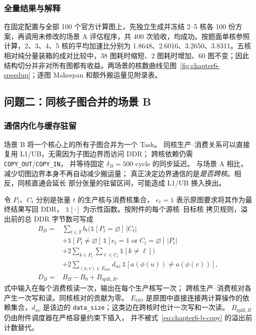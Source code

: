 \subsubsection{全量结果与解释}
在固定配置与全部 100 个官方计算图上，先独立生成并冻结 2--5 核各 100 份方案，再调用未修改的场景 A 评估程序，共 400 次验收，均成功。按题面单核参照计算，2、3、4、5 核的平均加速比分别为 1.8648、2.6016、3.2650、3.8311。五核相对纯分量装箱的成对比较中，38 图耗时缩短、2 图耗时增加、60 图不变；因此结构切分并非对所有图都有收益。两场景的核数曲线见图~\ref{fig:chapter6-speedup}；逐图 Makespan 和额外搬运量见附录表。

\subsection{问题二：同核子图合并的场景 B}
\subsubsection{通信内化与缓存驻留}
场景 B 将一个核心上的所有子图合并为一个 Task。
同核生产--消费关系可以直接复用 L1/UB，无需因为子图边界而访问 DDR；
跨核依赖仍需 \texttt{COPY\_OUT}/\texttt{COPY\_IN}，
并等待固定 $\delta_B=500$ cycle 的同步延迟。
与场景 A 相比，减少切图边界本身不再自动减少搬运量；
真正决定边界通信的是\emph{是否跨核}。相反，同核直通会延长
部分张量的驻留区间，可能造成 L1/UB 换入换出。

令 $P_t$、$C_t$ 分别是张量 $t$ 的生产核与消费核集合，
$e_t=1$ 表示原图要求将其作为最终结果写回 DDR，
$\mathbb 1[\cdot]$ 为示性函数。按附件的每个源核--目标核
拷贝规则，溢出前的总 DDR 字节数可写成
\begin{equation}
\begin{aligned}
B_B={}&\sum_{t\in T}b_t\Bigg(
\mathbb 1[P_t=\varnothing]\,|C_t|\\
&+\mathbb 1[P_t\ne\varnothing]\,
 \mathbb 1[e_t=1\;\mathrm{or}\;C_t=\varnothing]\,|P_t|\\
&+2\sum_{k\in P_t}\sum_{\ell\in C_t}\mathbb 1[k\ne\ell]
\Bigg)\\
&+2\sum_{(u,v)\in E_{OO}}d_{uv}\,
\mathbb 1[a(\phi(u))\ne a(\phi(v))],\\
D_B={}&B_B-B_0+B_{\mathrm{spill},B}.
\end{aligned}
\label{eq:chapter6-b-copy}
\end{equation}
式中输入在每个消费核读一次，输出在每个生产核写一次；
跨核生产--消费核对各产生一次写和读。同核核对的贡献为零。
$E_{OO}$ 是原图中直接连接两计算操作的依赖集合，$d_{uv}$
是该边的 \texttt{data\_size}；这类边在跨核时也计一次写和一次读。
$B_{\mathrm{spill},B}$ 仍由附件调度器在严格容量约束下插入，
并不被式~\eqref{eq:chapter6-b-copy} 的溢出前计数替代。

